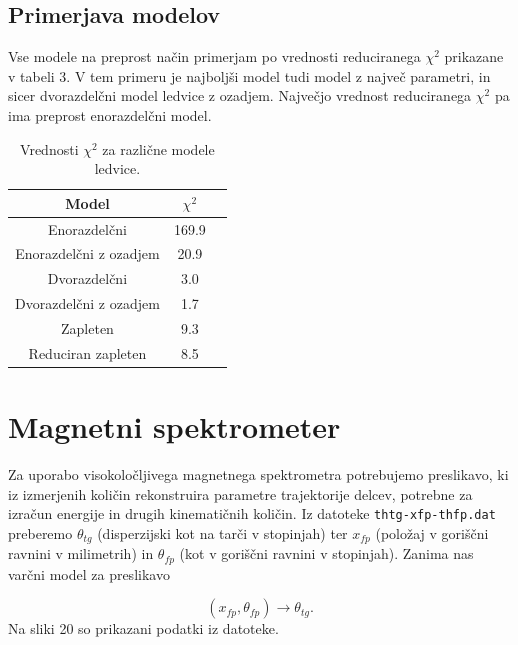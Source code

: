 \documentclass[slovene,11pt,a4paper]{article}
\begin{document}
\subsection{Primerjava modelov}

Vse modele na preprost način primerjam po vrednosti reduciranega $\chi^2$ prikazane v tabeli 3. V tem primeru je najboljši model tudi model z največ parametri, in sicer dvorazdelčni model ledvice z ozadjem. Največjo vrednost reduciranega $\chi^2$ pa ima preprost enorazdelčni model.

\begin{table}[h!]
\centering
\begin{tabular}{ccr}
\toprule
                 Model &      $\chi^2$ \\
\midrule
          Enorazdelčni &  169.9 \\
Enorazdelčni z ozadjem &   20.9 \\
          Dvorazdelčni &    3.0 \\
Dvorazdelčni z ozadjem &    1.7 \\
              Zapleten &    9.3 \\
    Reduciran zapleten &    8.5 \\
\bottomrule
\end{tabular}
\caption{Vrednosti $\chi^2$ za različne modele ledvice.}
\end{table}

\section{Magnetni spektrometer}

Za uporabo visokoločljivega magnetnega spektrometra potrebujemo preslikavo, ki iz izmerjenih količin rekonstruira parametre trajektorije delcev, potrebne za izračun energije in drugih kinematičnih količin. Iz datoteke \texttt{thtg-xfp-thfp.dat} preberemo $\theta_{tg}$ (disperzijski kot na tarči v stopinjah) ter $x_{fp}$ (položaj v goriščni ravnini v milimetrih) in $\theta_{fp}$ (kot v goriščni ravnini v stopinjah). Zanima nas varčni model za preslikavo

\begin{equation}
(x_{fp}, \theta_{fp}) \rightarrow \theta_{tg}.
\end{equation}
Na sliki 20 so prikazani podatki iz datoteke.
\end{document}
